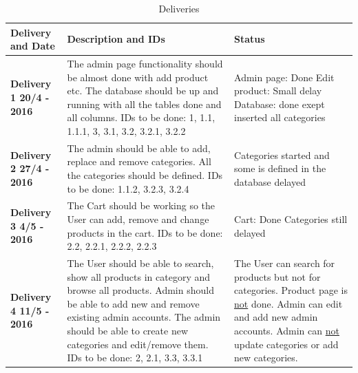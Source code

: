 \documentclass[a4paper,12pt]{article}
\begin{document}
\begin{table}[htbp]
	\centering
	\caption{Deliveries}
	\label{my-label}
	\begin{tabular}{|L{4cm}|L{7cm}|L{4cm}|}
		\hline
		\textbf{Delivery and Date}& \textbf{Description and IDs}                                                                                                                                                                                                                                                                                   & \textbf{Status} \\ \hline
		\textbf{Delivery 1  20/4 - 2016} & The admin page functionality should be almost done with add product etc. \newline The database should be up and running with all the tables done and all columns. \newline IDs to be done: 1, 1.1, 1.1.1, 3, 3.1, 3.2, 3.2.1, 3.2.2                                                                   &     Admin page: Done \newline Edit product: Small delay \newline Database: done exept inserted all categories            \\ \hline
		\textbf{Delivery 2 27/4 - 2016} & The admin should be able to add, replace and remove categories. \newline All the categories should be defined. \newline IDs to be done: 1.1.2, 3.2.3, 3.2.4                                                                                                                                            &  Categories started and some is defined in the database  delayed           \\ \hline
		\textbf{Delivery 3 4/5 - 2016}  & The Cart should be working so the User can add, remove and change products in the cart. \newline IDs to be done: 2.2, 2.2.1, 2.2.2, 2.2.3                                                                                                                                                      &  Cart: Done \newline Categories still delayed                \\ \hline
		\textbf{Delivery 4 11/5 - 2016} & The User should be able to search, show all products in category and browse all products. \newline Admin should be able to add new and remove existing admin accounts. \newline The admin should be able to create new categories and edit/remove them. \newline IDs to be done: 2, 2.1, 3.3, 3.3.1          &  The User can search for products but not for categories. \newline Product page is \underline{not} done. \newline Admin can edit and add new admin accounts. \newline Admin can \underline{not} update categories or add new categories.              \\ \hline

\end{tabular}
\end{table}
\end{document}
